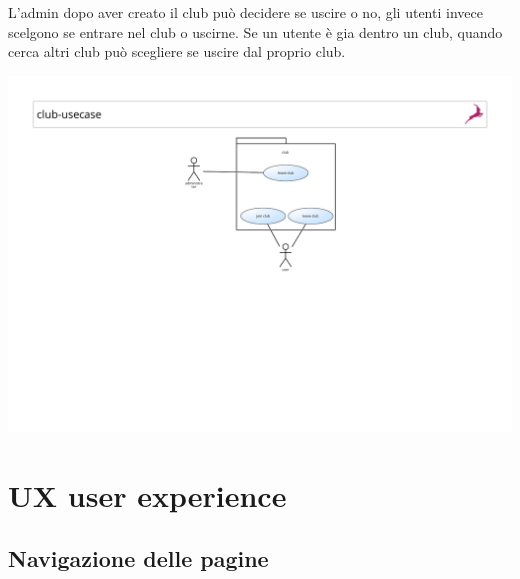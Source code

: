 \documentclass{article}
\begin{document}
L'admin dopo aver creato il club può decidere se uscire o no, gli utenti invece scelgono se entrare nel club o uscirne. Se un utente è gia dentro un club, quando cerca altri club può scegliere se uscire dal proprio club.
    \begin{center}
        \includegraphics[width=18cm]{UX/club-usecase}
    \end{center}

    \section{UX user experience}
    \subsection{ Navigazione delle pagine }
   
\end{document}
